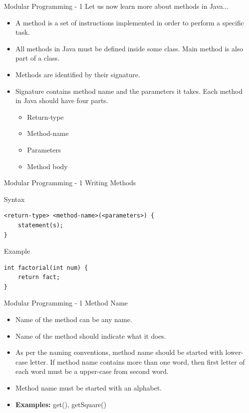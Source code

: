 \documentclass[14pt]{beamer}
\begin{document}
\begin{frame}{Modular Programming - 1}
\small
 Let us now learn more about methods in Java...
 \begin{itemize}
  \item A method is a set of instructions implemented in order to perform a specific task.
  \item All methods in Java must be defined inside some class. Main method is also part of a class.
  \item Methods are identified by their signature.
  \item Signature contains method name and the parameters it takes. Each method in Java should have four parts.
  \begin{itemize}
   \item Return-type
   \item Method-name
   \item Parameters
   \item Method body
  \end{itemize}

 \end{itemize}
\end{frame}

\begin{frame}[fragile]{Modular Programming - 1}
 Writing Methods
 \begin{block}{Syntax}
  \begin{lstlisting}[numbers=none]
<return-type> <method-name>(<parameters>) {
    statement(s);
}
  \end{lstlisting}
 \end{block}

 \begin{block}{Example}
  \begin{lstlisting}[numbers=none]
int factorial(int num) {
    return fact;
}
  \end{lstlisting}

 \end{block}

\end{frame}

\begin{frame}{Modular Programming - 1}
 Method Name
 \begin{itemize}
  \item Name of the method can be any name.
  \item Name of the method should indicate what it does.
  \item As per the naming conventions, method name should be started with lower-case letter. If method name contains more than one word, then first letter of each word must be a upper-case from second word.
  \item Method name must be started with an alphabet.
  \item \textbf{Examples:} get(), getSquare()
 \end{itemize}
\end{frame}
\end{document}

